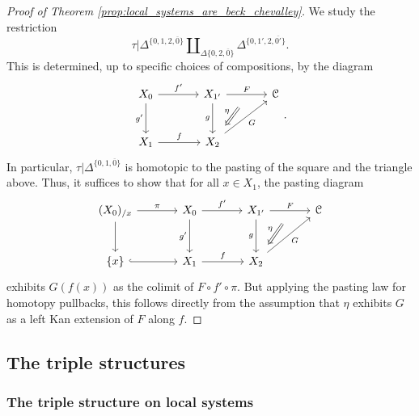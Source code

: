 \documentclass[main.tex]{subfiles}
\begin{document}
\begin{proof}[Proof of Theorem \ref{prop:local_systems_are_beck_chevalley}]
  We study the restriction
  \begin{equation*}
    \tau|\Delta^{\{0,1,2,\overline{0}\}} \amalg_{\Delta\{0,2,\overline{0}\}} \Delta^{\{0,1',2,\overline{0'}\}}.
  \end{equation*}
  This is determined, up to specific choices of compositions, by the diagram
  \begin{equation*}
    \begin{tikzcd}[row sep=large, column sep=large]
      X_{0}
      \arrow[r, "f'"]
      \arrow[d, swap, "g'"]
      & X_{1'}
      \arrow[d, swap, "g"]
      \arrow[r, "F", ""{swap, name=M}]
      & \category{C}
      \\
      X_{1}
      \arrow[r, "f"]
      & X_{2}
      \arrow[ur, swap, "G"]
      \arrow[from=M, Rightarrow, shorten=2ex, swap, "\eta"]
    \end{tikzcd}.
  \end{equation*}
  In particular, $\tau|\Delta^{\{0,1,\overline{0}\}}$ is homotopic to the pasting of the square and the triangle above. Thus, it suffices to show that for all $x \in X_{1}$, the pasting diagram
  \begin{equation*}
    \begin{tikzcd}[row sep=large, column sep=large]
      (X_{0})_{/x}
      \arrow[r, "\pi"]
      \arrow[d]
      & X_{0}
      \arrow[r, "f'"]
      \arrow[d, swap, "g'"]
      & X_{1'}
      \arrow[d, swap, "g"]
      \arrow[r, "F", ""{swap, name=M}]
      & \category{C}
      \\
      \{x\}
      \arrow[r, hook]
      & X_{1}
      \arrow[r, "f"]
      & X_{2}
      \arrow[ur, swap, "G"]
      \arrow[from=M, Rightarrow, shorten=2ex, swap, "\eta"]
    \end{tikzcd}
  \end{equation*}
  exhibits $G(f(x))$ as the colimit of $F \circ f' \circ \pi$. But applying the pasting law for homotopy pullbacks, this follows directly from the assumption that $\eta$ exhibits $G$ as a left Kan extension of $F$ along $f$.
\end{proof}

\subsection{The triple structures}
\label{ssc:the_triple_structures_bare}

\subsubsection{The triple structure on local systems}
\label{sss:the_triple_structure_on_local_systems}
\end{document}

